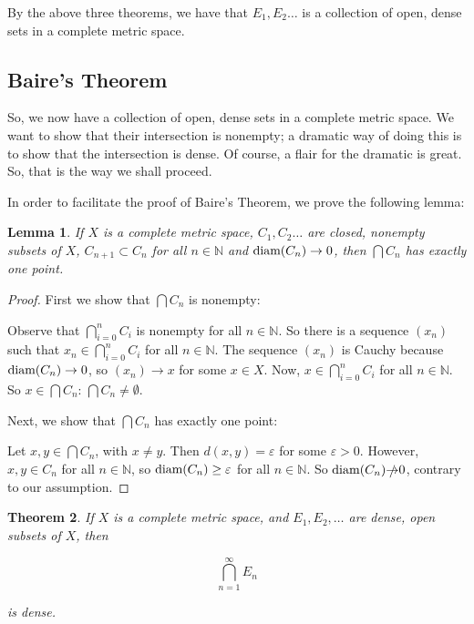 \documentclass{amsart}
\newcommand{\vep}{\varepsilon}
\newcommand{\N}{\mathbb{N}}
\newcommand{\diam}{\text{\rm diam}}
\newtheorem{thm}{Theorem}[section]
\newtheorem{lem}[thm]{Lemma}
\theoremstyle{definition}
\begin{document}
By the above three theorems, we have that $E_1, E_2 \ldots$ is a collection of open, dense sets in a complete metric space. 

\subsection{Baire's Theorem}

So, we now have a collection of open, dense sets in a complete metric space. 
We want to show that their intersection is nonempty; a dramatic way of doing this is to show that the intersection is dense. 
Of course, a flair for the dramatic is great. 
So, that is the way we shall proceed. 

In order to facilitate the proof of Baire's Theorem, we prove the following lemma:

\begin{lem}
If $X$ is a complete metric space, $C_1, C_2 \ldots$ are closed, nonempty subsets of $X$, $C_{n+1} \subset C_n$ for all $n \in \N$ and $\diam(C_n) \to 0$, then $\bigcap C_n$ has exactly one point.
\end{lem}

\begin{proof}
First we show that $\bigcap C_n$ is nonempty: 

Observe that $\bigcap\limits_{i=0}^n C_i$ is nonempty for all $n \in \N$. 
So there is a sequence $(x_n)$ such that $x_n \in \bigcap\limits_{i=0}^n C_i$ for all $n \in \N$. 
The sequence $(x_n)$ is Cauchy because $\diam(C_n) \to 0$, so $(x_n) \to x$ for some $x \in X$.
Now, $x \in \bigcap\limits_{i=0}^n C_i$ for all $n \in \N$.
So $x \in \bigcap C_n$: $\bigcap C_n \neq \emptyset$.

Next, we show that $\bigcap C_n$ has exactly one point:

Let $x, y \in \bigcap C_n$, with $x \neq y$. 
Then $d(x,y) = \vep$ for some $\vep >0$. 
However, $x,y \in C_n$ for all $n \in \N$,
so $\diam(C_n) \geq \vep$ for all $n \in \N$. 
So $\diam(C_n) \slashed{\to} 0$, contrary to our assumption.
\end{proof}

\begin{thm}If $X$ is a complete metric space, and $E_1, E_2, \ldots$ are dense, open subsets of $X$, then

\begin{displaymath}
\bigcap\limits_{n = 1}^{\infty} E_n
\end{displaymath}

is dense.
\end{thm}
\end{document}
